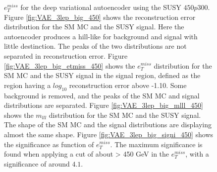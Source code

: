 \begin{figure}[!htb]
{    $e_T^{miss}$ for the deep variational autoencoder using the SUSY $450p300$.
    Figure \ref{fig:VAE_3lep_big_450} shows the reconstruction error 
    distribution for the SM MC and the SUSY signal. Here the autoencoder produces a hill-like for background and 
    signal with little destinction. The peaks of the two distributions are not separated in reconstruction error. Figure \ref{fig:VAE_3lep_big_etmiss_450} 
    shows the $e_T^{miss}$ distribution for the SM MC and the SUSY signal in the signal region, defined as the region having a $log_{10}$ 
    reconstruction error above -1.10. Some background is removed, and the peaks of the SM MC and signal 
    distributions are separated. Figure \ref{fig:VAE_3lep_big_mlll_450} shows the $m_{lll}$ distribution for the SM MC and the SUSY signal. 
    The shape of the SM MC and the signal distributions are displaying almost the same shape. Figure \ref{fig:VAE_3lep_big_signi_450} shows the significance as 
    function of $e_T^{miss}$. The maximum significance is found when applying a cut of about > 450 GeV in the $e_T^{miss}$, with a significance of around $4.1$.}
    \label{fig:VAE_3lep_big_rec_sig_signi_450}
\end{figure}

